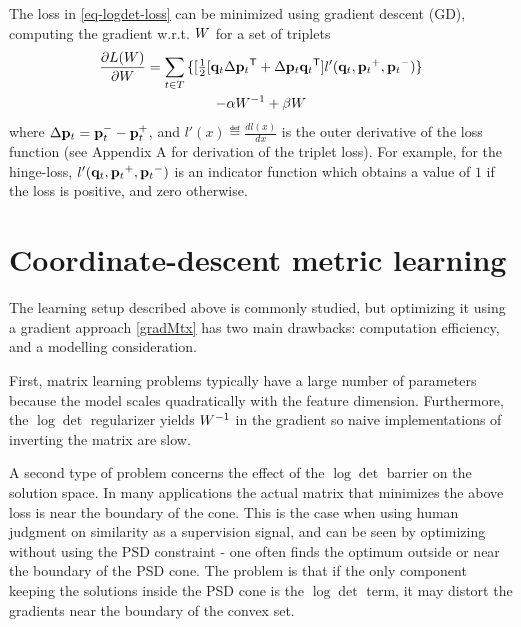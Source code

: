 \documentclass{article}
\begin{document}
The loss in \eqref{eq-logdet-loss} can be minimized using gradient descent (GD), computing the gradient w.r.t. ${W}$ for a set of triplets
\begin{multline}
  \frac{\partial {L ({W})}}{\partial {W}} = \sum\limits_{t\in T}{\{
  [\tfrac{1}{2}[{\mathbf{q}}_{t}\Delta{\mathbf{p}}_{t}{}^\mathsf{T} + \Delta{\mathbf{p}}_{t}{\mathbf{q}}_{t}{}^\mathsf{T}]  }
  {l'}({{\mathbf{q}}_{{t}}}, {{\mathbf{p}}_{{t}}}^{+}, {{\mathbf{p}}_{{t}}}^{-})\} \\- \alpha {W}^{-1} + \beta {W}
  \label{gradMtx}
\end{multline}
where $\Delta{\mathbf{p}}_t = {\mathbf{p}}_t^- - {\mathbf{p}}_t^+$, and $l'(x) \eqdef \frac{d{l(x)}}{dx}$ is the outer derivative of the loss function (see Appendix A for derivation of the triplet loss). For example, for the hinge-loss, 
$l'({{\mathbf{q}}_{{t}}}, {{\mathbf{p}}_{{t}}}^{+}, {{\mathbf{p}}_{{t}}}^{-})$ 
is an indicator function which obtains a value of $1$ if the loss is positive, and zero otherwise.


\section{Coordinate-descent metric learning}

The learning setup described above is commonly studied, but 
optimizing it using a gradient approach \eqref{gradMtx} has two main drawbacks: computation efficiency, and a modelling consideration.

First, matrix learning problems typically have a large number of parameters because the model scales quadratically with the feature dimension. %
Furthermore, the $\log \det$ regularizer yields ${W}^{-1}$ in the gradient so naive implementations of inverting the matrix are slow.

A second type of problem concerns the effect of the $\log \det$ barrier on the solution space. In many applications the actual matrix that minimizes the above loss is near the boundary of the cone. This is the case when using human judgment on similarity as a supervision signal, and can be seen by optimizing without using the PSD constraint - one often finds the optimum outside or near the boundary of the PSD cone.
The problem is that if the only component keeping the solutions inside the PSD cone is the $\log \det$ term, it may distort the gradients near the boundary of the convex set. 
\end{document}
